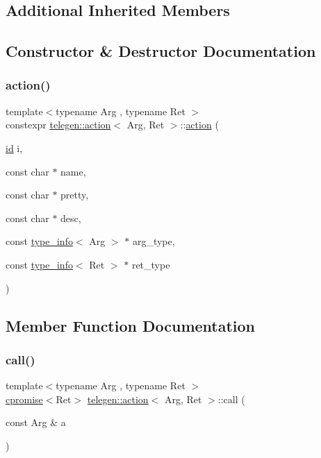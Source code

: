 \subsection*{Additional Inherited Members}


\subsection{Constructor \& Destructor Documentation}
\mbox{\label{classtelegen_1_1action_abb0b9cd50183ff3125d9056585db7571}} 
\subsubsection{\texorpdfstring{action()}{action()}}
{\footnotesize\ttfamily template$<$typename Arg , typename Ret $>$ \\
constexpr \hyperlink{classtelegen_1_1action}{telegen\+::action}$<$ Arg, Ret $>$\+::\hyperlink{classtelegen_1_1action}{action} (\begin{DoxyParamCaption}\item[{\hyperlink{classtelegen_1_1node_aae3ff0d12932c55fdc88a1743e27ea56}{id}}]{i,  }\item[{const char $\ast$}]{name,  }\item[{const char $\ast$}]{pretty,  }\item[{const char $\ast$}]{desc,  }\item[{const \hyperlink{structtelegen_1_1type__info}{type\+\_\+info}$<$ Arg $>$ $\ast$}]{arg\+\_\+type,  }\item[{const \hyperlink{structtelegen_1_1type__info}{type\+\_\+info}$<$ Ret $>$ $\ast$}]{ret\+\_\+type }\end{DoxyParamCaption})\hspace{0.3cm}{\ttfamily [inline]}}



\subsection{Member Function Documentation}
\mbox{\label{classtelegen_1_1action_aebcc7f33d0abdbace3d893ef1ea07a6a}} 
\subsubsection{\texorpdfstring{call()}{call()}}
{\footnotesize\ttfamily template$<$typename Arg , typename Ret $>$ \\
\hyperlink{namespacetelegen_a73ca2c44e7e302c2405f99a28e35acb7}{cpromise}$<$Ret$>$ \hyperlink{classtelegen_1_1action}{telegen\+::action}$<$ Arg, Ret $>$\+::call (\begin{DoxyParamCaption}\item[{const Arg \&}]{a }\end{DoxyParamCaption})\hspace{0.3cm}{\ttfamily [inline]}}


